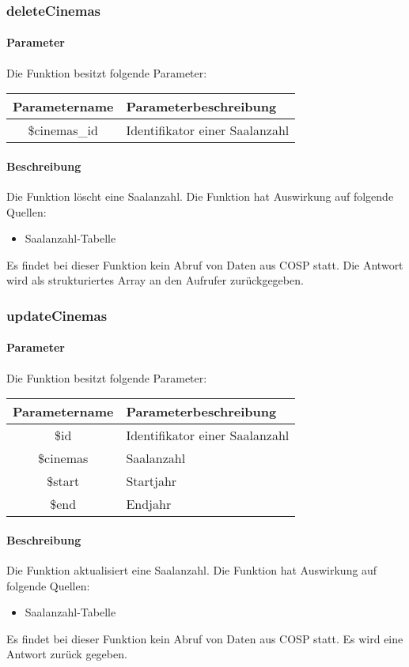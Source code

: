 \subsubsection{deleteCinemas}
\paragraph{Parameter} Die Funktion besitzt folgende Parameter:
\begin{table}[H]
	\begin{tabular}{|c|p{11cm}|}
		\hline
		\textbf{Parametername} & \textbf{Parameterbeschreibung} \\ \hline
		\$cinemas\_id       & Identifikator einer Saalanzahl \\ \hline
	\end{tabular}
\end{table}
\paragraph{Beschreibung} Die Funktion löscht eine Saalanzahl. Die Funktion hat Auswirkung auf folgende Quellen:
\begin{itemize}
	\item Saalanzahl-Tabelle
\end{itemize}
Es findet bei dieser Funktion kein Abruf von Daten aus {\glqq COSP\grqq} statt. Die Antwort wird als strukturiertes Array an den Aufrufer zurückgegeben.
\subsubsection{updateCinemas}
\paragraph{Parameter} Die Funktion besitzt folgende Parameter:
\begin{table}[H]
	\begin{tabular}{|c|p{11cm}|}
		\hline
		\textbf{Parametername} & \textbf{Parameterbeschreibung} \\ \hline
		\$id       & Identifikator einer Saalanzahl \\ \hline
		\$cinemas  & Saalanzahl \\ \hline
		\$start    & Startjahr \\ \hline
		\$end      & Endjahr \\ \hline
	\end{tabular}
\end{table}
\paragraph{Beschreibung} Die Funktion aktualisiert eine Saalanzahl. Die Funktion hat Auswirkung auf folgende Quellen:
\begin{itemize}
	\item Saalanzahl-Tabelle
\end{itemize}
Es findet bei dieser Funktion kein Abruf von Daten aus {\glqq COSP\grqq} statt. Es wird eine Antwort zurück gegeben.
